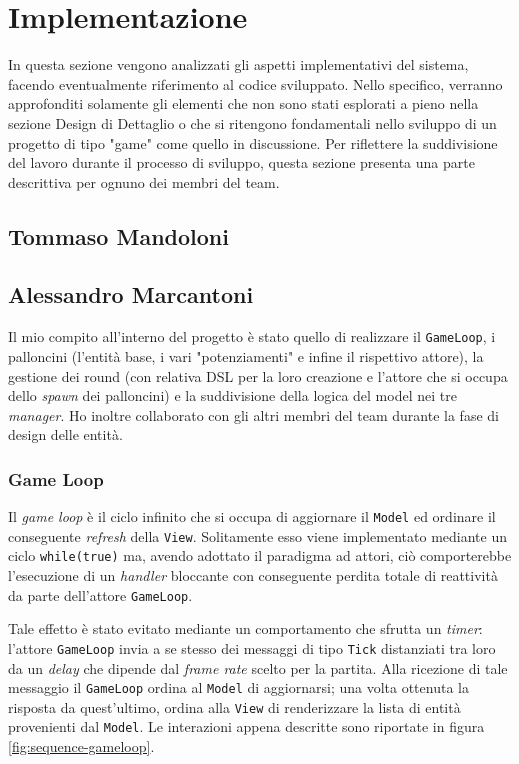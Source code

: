 \section{Implementazione}
In questa sezione vengono analizzati gli aspetti implementativi del sistema, facendo eventualmente riferimento al codice
sviluppato. Nello specifico, verranno approfonditi solamente gli elementi che non sono stati esplorati a pieno nella
sezione Design di Dettaglio o che si ritengono fondamentali nello sviluppo di un progetto di tipo "game" come quello in
discussione. Per riflettere la suddivisione del lavoro durante il processo di sviluppo, questa sezione presenta una
parte descrittiva per ognuno dei membri del team.

\subsection{Tommaso Mandoloni}

\subsection{Alessandro Marcantoni}
Il mio compito all'interno del progetto è stato quello di realizzare il \texttt{GameLoop}, i palloncini (l'entità base,
i vari "potenziamenti" e infine il rispettivo attore), la gestione dei round (con relativa DSL per la loro creazione e
l'attore che si occupa dello \textit{spawn} dei palloncini) e la suddivisione della logica del model nei tre
\textit{manager}. Ho inoltre collaborato con gli altri membri del team durante la fase di design delle entità.

\subsubsection{Game Loop}
Il \textit{game loop} è il ciclo infinito che si occupa di aggiornare il \texttt{Model} ed ordinare il conseguente
\textit{refresh} della \texttt{View}. Solitamente esso viene implementato mediante un ciclo \texttt{while(true)} ma,
avendo adottato il paradigma ad attori, ciò comporterebbe l'esecuzione di un \textit{handler} bloccante con
conseguente perdita totale di reattività da parte dell'attore \texttt{GameLoop}.

Tale effetto è stato evitato mediante un comportamento che sfrutta un \textit{timer}: l'attore \texttt{GameLoop} invia a
se stesso dei messaggi di tipo \texttt{Tick} distanziati tra loro da un \textit{delay} che dipende dal
\textit{frame rate} scelto per la partita. Alla ricezione di tale messaggio il \texttt{GameLoop} ordina al
\texttt{Model} di aggiornarsi; una volta ottenuta la risposta da quest'ultimo, ordina alla \texttt{View} di renderizzare
la lista di entità provenienti dal \texttt{Model}. Le interazioni appena descritte sono riportate in figura
\ref{fig:sequence-gameloop}.

